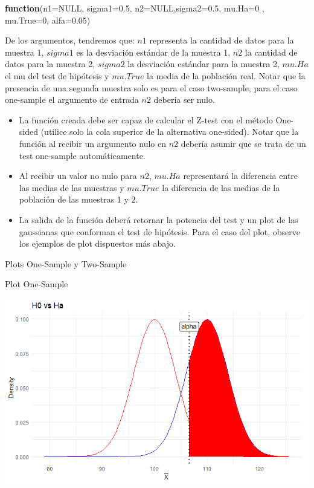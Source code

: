 \documentclass[]{article}
\newenvironment{Shaded}{\begin{snugshade}}{\end{snugshade}}
\newcommand{\AttributeTok}[1]{\textcolor[rgb]{0.77,0.63,0.00}{#1}}
\newcommand{\ConstantTok}[1]{\textcolor[rgb]{0.00,0.00,0.00}{#1}}
\newcommand{\ControlFlowTok}[1]{\textcolor[rgb]{0.13,0.29,0.53}{\textbf{#1}}}
\newcommand{\DecValTok}[1]{\textcolor[rgb]{0.00,0.00,0.81}{#1}}
\newcommand{\FloatTok}[1]{\textcolor[rgb]{0.00,0.00,0.81}{#1}}
\newcommand{\NormalTok}[1]{#1}
\providecommand{\tightlist}{%
  \setlength{\itemsep}{0pt}\setlength{\parskip}{0pt}}
\begin{document}
\begin{Shaded}
\begin{Highlighting}[]
    \ControlFlowTok{function}\NormalTok{(}\AttributeTok{n1=}\ConstantTok{NULL}\NormalTok{, }\AttributeTok{sigma1=}\FloatTok{0.5}\NormalTok{, }
    \AttributeTok{n2=}\ConstantTok{NULL}\NormalTok{,}\AttributeTok{sigma2=}\FloatTok{0.5}\NormalTok{, }\AttributeTok{mu.Ha=}\DecValTok{0}\NormalTok{ , }
    \AttributeTok{mu.True=}\DecValTok{0}\NormalTok{, }\AttributeTok{alfa=}\FloatTok{0.05}\NormalTok{)}
\end{Highlighting}
\end{Shaded}

De los argumentos, tendremos que: \(n1\) representa la cantidad de datos
para la muestra 1, \(sigma1\) es la desviación estándar de la muestra 1,
\(n2\) la cantidad de datos para la muestra 2, \(sigma2\) la desviación
estándar para la muestra 2, \(mu.Ha\) el mu del test de hipótesis y
\(mu.True\) la media de la población real. Notar que la presencia de una
segunda muestra solo es para el caso two-sample, para el caso one-sample
el argumento de entrada \(n2\) debería ser nulo.

\begin{itemize}
\tightlist
\item
  La función creada debe ser capaz de calcular el Z-test con el método
  One-sided (utilice solo la cola superior de la alternativa one-sided).
  Notar que la función al recibir un argumento nulo en \(n2\) debería
  asumir que se trata de un test one-sample automáticamente.
\item
  Al recibir un valor no nulo para \(n2\), \(mu.Ha\) representará la
  diferencia entre las medias de las muestras y \(mu.True\) la
  diferencia de las medias de la población de las muestras 1 y 2.
\item
  La salida de la función deberá retornar la potencia del test y un plot
  de las gaussianas que conforman el test de hipótesis. Para el caso del
  plot, observe los ejemplos de plot dispuestos más abajo.
\end{itemize}

Plots One-Sample y Two-Sample

Plot One-Sample

\includegraphics{plot_potencia.png}
\end{document}
